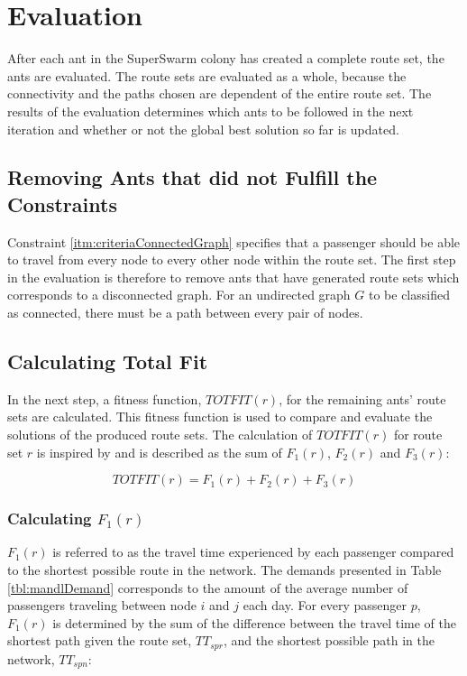 \section{Evaluation}
\label{sec:algoEvaluation}
After each ant in the SuperSwarm colony has created a complete route set, the ants are evaluated. The route sets are evaluated as a whole, because the connectivity and the paths chosen are dependent of the entire route set. The results of the evaluation determines which ants to be followed in the next iteration and whether or not the global best solution so far is updated. 

\subsection{Removing Ants that did not Fulfill the Constraints}
\label{sec:algoRemoval}
Constraint \vref{itm:criteriaConnectedGraph} specifies that a passenger should be able to travel from every node to every other node within the route set. The first step in the evaluation is therefore to remove ants that have generated route sets which corresponds to a disconnected graph. For an undirected graph $G$ to be classified as connected, there must be a path between every pair of nodes. 

\subsection{Calculating Total Fit}
\label{sec:totfit}
In the next step, a fitness function, $TOTFIT(r)$, for the remaining ants' route sets are calculated. This fitness function is used to compare and evaluate the solutions of the produced route sets. The calculation of $TOTFIT(r)$ for route set $r$ is inspired by \citet{kechagiopoulos14} and is described as the sum of $F_{1}(r)$, $F_{2}(r)$ and $F_{3}(r)$: 

$$ TOTFIT(r) = F_{1}(r) + F_{2}(r) + F_{3}(r)$$

\subsubsection{Calculating $F_{1}(r)$}
\label{sec:f1}
$F_{1}(r)$ is referred to as the travel time experienced by each passenger compared to the shortest possible route in the network. The demands presented in Table \vref{tbl:mandlDemand} corresponds to the amount of the average number of passengers traveling between node $i$ and $j$ each day. For every passenger $p$, $F_{1}(r)$ is determined by the sum of the difference between the travel time of the shortest path given the route set, $TT_{spr}$, and the shortest possible path in the network, $TT_{spn}$:


